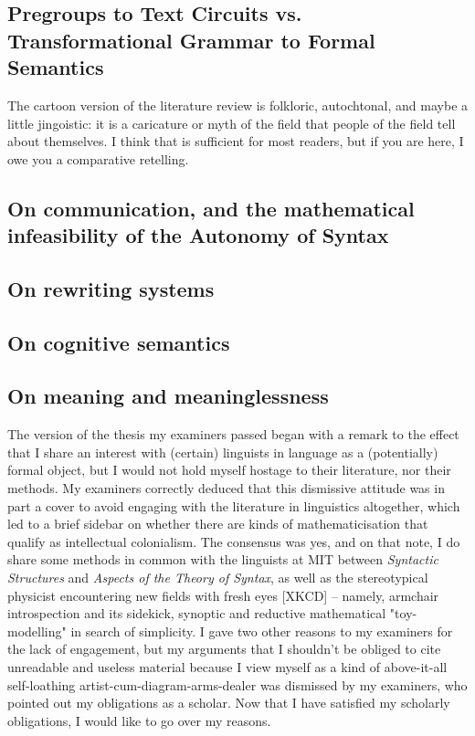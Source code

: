 \subsection{Pregroups to Text Circuits vs. Transformational Grammar to Formal Semantics}

The cartoon version of the literature review is folkloric, autochtonal, and maybe a little jingoistic: it is a caricature or myth of the field that people of the field tell about themselves. I think that is sufficient for most readers, but if you are here, I owe you a comparative retelling.

\subsection{On communication, and the mathematical infeasibility of the Autonomy of Syntax}

\subsection{On rewriting systems}

\subsection{On cognitive semantics}

\subsection{On meaning and meaninglessness}

The version of the thesis my examiners passed began with a remark to the effect that I share an interest with (certain) linguists in language as a (potentially) formal object, but I would not hold myself hostage to their literature, nor their methods. My examiners correctly deduced that this dismissive attitude was in part a cover to avoid engaging with the literature in linguistics altogether, which led to a brief sidebar on whether there are kinds of mathematicisation that qualify as intellectual colonialism. The consensus was yes, and on that note, I do share some methods in common with the linguists at MIT between \emph{Syntactic Structures} and \emph{Aspects of the Theory of Syntax}, as well as the stereotypical physicist encountering new fields with fresh eyes [XKCD] -- namely, armchair introspection and its sidekick, synoptic and reductive mathematical "toy-modelling" in search of simplicity. I gave two other reasons to my examiners for the lack of engagement, but my arguments that I shouldn't be obliged to cite unreadable and useless material because I view myself as a kind of above-it-all self-loathing artist-cum-diagram-arms-dealer was dismissed by my examiners, who pointed out my obligations as a scholar. Now that I have satisfied my scholarly obligations, I would like to go over my reasons.\\

